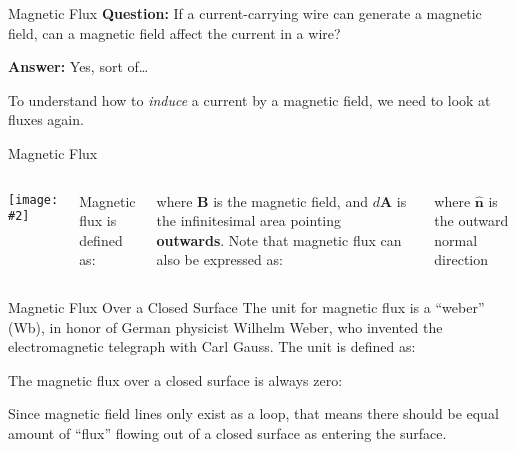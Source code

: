 \documentclass[12pt,aspectratio=169]{beamer}
\newcommand{\pic}[2]{\texttt{[image: \#2]}}
\newcommand{\mb}[1]{\mathbf{#1}}
\newcommand{\eq}[2]{\vspace{#1}{\Large\begin{displaymath}#2\end{displaymath}}}
\begin{document}
\begin{frame}{Magnetic Flux}
  \textbf{Question:} If a current-carrying wire can generate a magnetic field,
  can a magnetic field affect the current in a wire?

  \vspace{.3in}\textbf{Answer:} Yes, sort of\ldots

  \vspace{.3in}To understand how to \emph{induce} a current by a magnetic field,
  we need to look at fluxes again.
\end{frame}


\begin{frame}{Magnetic Flux}
  \begin{columns}
    \pic{1.1}{flux2.png}
  
    Magnetic flux is defined as:
    
    \eq{-.15in}{
      \boxed{\Phi_M=\int\mb{B}\cdot d\mb{A}}
    }
    
    where $\mb{B}$ is the magnetic field, and $d\mb{A}$ is the infinitesimal
    area pointing \textbf{outwards}. Note that magnetic flux can also be
    expressed as:

    \eq{-.2in}{
      \boxed{\Phi_M=\int\mb{B}\cdot\hat{\mb{n}}dA}
    }

    where $\hat{\mb{n}}$ is the outward normal direction
  \end{columns}
\end{frame}



\begin{frame}{Magnetic Flux Over a Closed Surface}
  The unit for magnetic flux is a ``weber'' (\si{\weber}), in honor of German
  physicist Wilhelm Weber, who invented the electromagnetic telegraph with Carl
  Gauss. The unit is defined as:

  \eq{-.3in}{\SI{1}{\weber}=\SI{1}{\tesla.\metre^2}}
  
  \vspace{-.2in}The magnetic flux over a closed surface is always zero:

  \eq{-.2in}{
    \boxed{\oint\mb{B}\cdot d\mb{A}=0}
  }

  Since magnetic field lines only exist as a loop, that means there should be
  equal amount of ``flux'' flowing out of a closed surface as entering the
  surface.
\end{frame}
\end{document}
